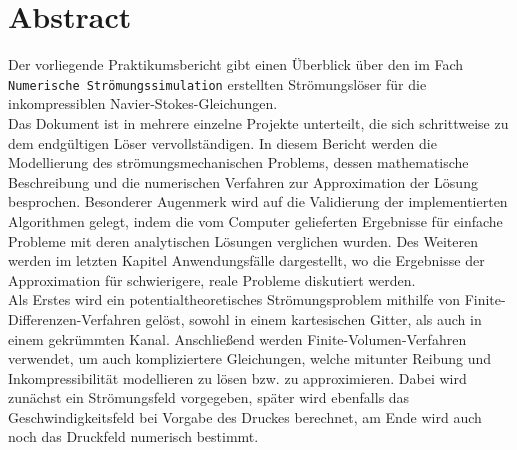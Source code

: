 \chapter*{Abstract}
\flushleft
Der vorliegende Praktikumsbericht gibt einen \"Uberblick \"uber den im Fach \texttt{Numerische Str\"omungssimulation} erstellten Str\"omungsl\"oser f\"ur die inkompressiblen Navier-Stokes-Gleichungen. \\ [0.5cm]

Das Dokument ist in mehrere einzelne Projekte unterteilt, die sich schrittweise zu dem endg\"ultigen L\"oser vervollst\"andigen. In diesem Bericht werden die Modellierung des str\"omungsmechanischen Problems, dessen mathematische Beschreibung und die numerischen Verfahren zur Approximation der L\"osung besprochen. Besonderer Augenmerk wird auf  die Validierung der implementierten Algorithmen gelegt, indem die vom Computer gelieferten Ergebnisse f\"ur einfache Probleme mit deren analytischen L\"osungen verglichen wurden. Des Weiteren werden im letzten Kapitel Anwendungsf\"alle dargestellt, wo die Ergebnisse der Approximation f\"ur schwierigere, reale Probleme diskutiert werden. \\[1cm]

Als Erstes wird ein potentialtheoretisches Str\"omungsproblem mithilfe von Finite-Differenzen-Verfahren gel\"ost, sowohl in einem kartesischen Gitter, als auch in einem gekr\"ummten Kanal. Anschlie\ss{}end werden Finite-Volumen-Verfahren verwendet, um auch kompliziertere Gleichungen, welche mitunter Reibung und Inkompressibilit\"at modellieren zu l\"osen bzw. zu approximieren. Dabei wird zun\"achst ein Str\"omungsfeld vorgegeben, sp\"ater wird ebenfalls das Geschwindigkeitsfeld bei Vorgabe des Druckes berechnet, am Ende wird auch noch das Druckfeld numerisch bestimmt.
